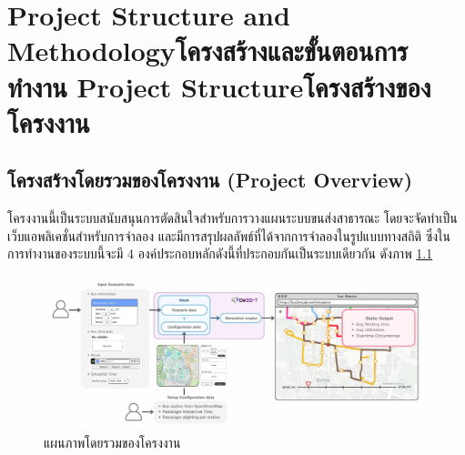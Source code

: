 \chapter{\ifproject%
\ifenglish Project Structure and Methodology\else โครงสร้างและขั้นตอนการทำงาน\fi
\else%
\ifenglish Project Structure\else โครงสร้างของโครงงาน\fi
\fi
}

\makeatletter


\makeatother

\section{โครงสร้างโดยรวมของโครงงาน (Project Overview) }
\begin{mypara}
    \indent โครงงานนี้เป็นระบบสนับสนุนการตัดสินใจสำหรับการวางแผนระบบขนส่งสาธารณะ 
    โดยจะจัดทำเป็นเว็บแอพลิเคชั่นสำหรับการจำลอง และมีการสรุปผลลัพธ์ที่ได้จากการจำลองในรูปแบบทางสถิติ
    ซึ่งในการทำงานของระบบนี้จะมี 4 องค์ประกอบหลักดังนี้ที่ประกอบกันเป็นระบบเดียวกัน ดังภาพ \ref{fig:overview}  
\end{mypara}


\begin{figure}[H]
    \centering
    \includegraphics[width=\textwidth,height=0.9\textheight,keepaspectratio]{overview.png}
    \caption{แผนภาพโดยรวมของโครงงาน}
    \label{fig:overview}
\end{figure}

